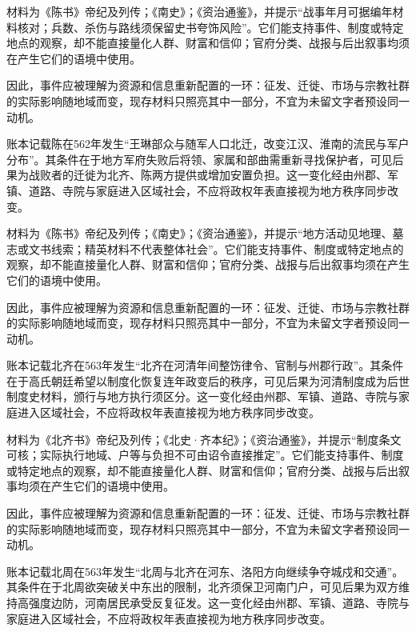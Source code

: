 材料为《陈书》帝纪及列传；《南史》；《资治通鉴》，并提示“战事年月可据编年材料核对；兵数、杀伤与路线须保留史书夸饰风险”。它们能支持事件、制度或特定地点的观察，却不能直接量化人群、财富和信仰；官府分类、战报与后出叙事均须在产生它们的语境中使用。

因此，事件应被理解为资源和信息重新配置的一环：征发、迁徙、市场与宗教社群的实际影响随地域而变，现存材料只照亮其中一部分，不宜为未留文字者预设同一动机。

账本记载陈在562年发生“王琳部众与随军人口北迁，改变江汉、淮南的流民与军户分布”。其条件在于地方军府失败后将领、家属和部曲需重新寻找保护者，可见后果为战败者的迁徙为北齐、陈两方提供或增加安置负担。这一变化经由州郡、军镇、道路、寺院与家庭进入区域社会，不应将政权年表直接视为地方秩序同步改变。

材料为《陈书》帝纪及列传；《南史》；《资治通鉴》，并提示“地方活动见地理、墓志或文书线索；精英材料不代表整体社会”。它们能支持事件、制度或特定地点的观察，却不能直接量化人群、财富和信仰；官府分类、战报与后出叙事均须在产生它们的语境中使用。

因此，事件应被理解为资源和信息重新配置的一环：征发、迁徙、市场与宗教社群的实际影响随地域而变，现存材料只照亮其中一部分，不宜为未留文字者预设同一动机。

账本记载北齐在563年发生“北齐在河清年间整饬律令、官制与州郡行政”。其条件在于高氏朝廷希望以制度化恢复连年政变后的秩序，可见后果为河清制度成为后世制度史材料，颁行与地方执行须区分。这一变化经由州郡、军镇、道路、寺院与家庭进入区域社会，不应将政权年表直接视为地方秩序同步改变。

材料为《北齐书》帝纪及列传；《北史·齐本纪》；《资治通鉴》，并提示“制度条文可核；实际执行地域、户等与负担不可由诏令直接推定”。它们能支持事件、制度或特定地点的观察，却不能直接量化人群、财富和信仰；官府分类、战报与后出叙事均须在产生它们的语境中使用。

因此，事件应被理解为资源和信息重新配置的一环：征发、迁徙、市场与宗教社群的实际影响随地域而变，现存材料只照亮其中一部分，不宜为未留文字者预设同一动机。

账本记载北周在563年发生“北周与北齐在河东、洛阳方向继续争夺城戍和交通”。其条件在于北周欲突破关中东出的限制，北齐须保卫河南门户，可见后果为双方维持高强度边防，河南居民承受反复征发。这一变化经由州郡、军镇、道路、寺院与家庭进入区域社会，不应将政权年表直接视为地方秩序同步改变。

